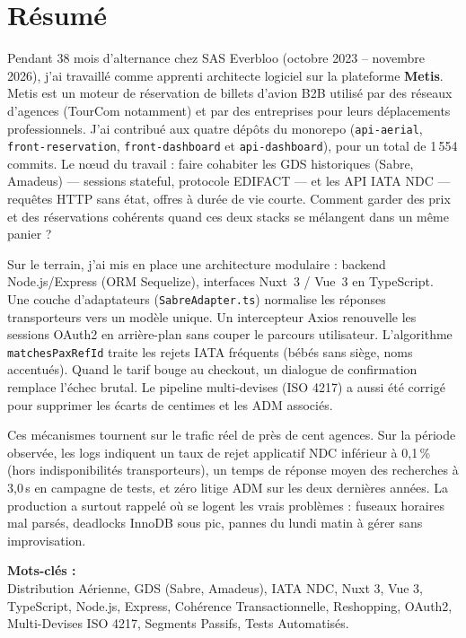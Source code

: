 \chapter*{Résumé}

\noindent Pendant 38 mois d'alternance chez SAS Everbloo (octobre 2023 -- novembre 2026), j'ai travaillé comme apprenti architecte logiciel sur la plateforme \textbf{Metis}. Metis est un moteur de réservation de billets d'avion B2B utilisé par des réseaux d'agences (TourCom notamment) et par des entreprises pour leurs déplacements professionnels. J'ai contribué aux quatre dépôts du monorepo (\texttt{api-aerial}, \texttt{front-reservation}, \texttt{front-dashboard} et \texttt{api-dashboard}), pour un total de 1\,554 commits. Le nœud du travail : faire cohabiter les GDS historiques (Sabre, Amadeus) --- sessions stateful, protocole EDIFACT --- et les API IATA NDC --- requêtes HTTP sans état, offres à durée de vie courte. Comment garder des prix et des réservations cohérents quand ces deux stacks se mélangent dans un même panier ?

\noindent Sur le terrain, j'ai mis en place une architecture modulaire : backend Node.js/Express (ORM Sequelize), interfaces Nuxt~3 / Vue~3 en TypeScript. Une couche d'adaptateurs (\texttt{SabreAdapter.ts}) normalise les réponses transporteurs vers un modèle unique. Un intercepteur Axios renouvelle les sessions OAuth2 en arrière-plan sans couper le parcours utilisateur. L'algorithme \texttt{matchesPaxRefId} traite les rejets IATA fréquents (bébés sans siège, noms accentués). Quand le tarif bouge au checkout, un dialogue de confirmation remplace l'échec brutal. Le pipeline multi-devises (ISO 4217) a aussi été corrigé pour supprimer les écarts de centimes et les ADM associés.

\noindent Ces mécanismes tournent sur le trafic réel de près de cent agences. Sur la période observée, les logs indiquent un taux de rejet applicatif NDC inférieur à 0,1\,\% (hors indisponibilités transporteurs), un temps de réponse moyen des recherches à 3,0\,s en campagne de tests, et zéro litige ADM sur les deux dernières années. La production a surtout rappelé où se logent les vrais problèmes : fuseaux horaires mal parsés, deadlocks InnoDB sous pic, pannes du lundi matin à gérer sans improvisation.

\vspace{0.6cm}
\noindent \textbf{\large Mots-clés :}\\
\noindent Distribution Aérienne, GDS (Sabre, Amadeus), IATA NDC, Nuxt 3, Vue 3, TypeScript, Node.js, Express, Cohérence Transactionnelle, Reshopping, OAuth2, Multi-Devises ISO 4217, Segments Passifs, Tests Automatisés.
